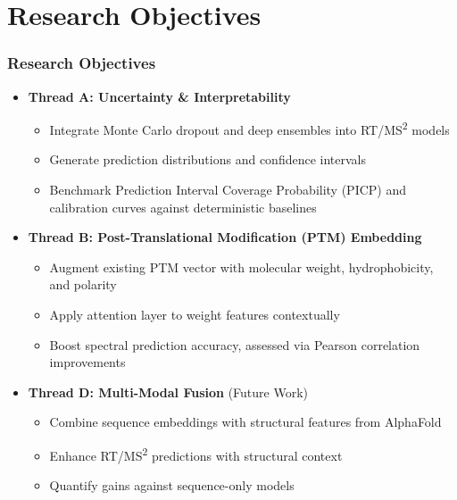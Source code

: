 \documentclass{beamer}
\begin{document}
\section{Research Objectives}
\begin{frame}
  \frametitle{Research Objectives}
  \begin{itemize}
    \item \textbf{Thread A: Uncertainty \& Interpretability}
    \begin{itemize}
      \item Integrate Monte Carlo dropout and deep ensembles into RT/MS\textsuperscript{2} models
      \item Generate prediction distributions and confidence intervals
      \item Benchmark Prediction Interval Coverage Probability (PICP) and calibration curves against deterministic baselines
    \end{itemize}
    \item \textbf{Thread B: Post-Translational Modification (PTM) Embedding}
    \begin{itemize}
      \item Augment existing PTM vector with molecular weight, hydrophobicity, and polarity
      \item Apply attention layer to weight features contextually
      \item Boost spectral prediction accuracy, assessed via Pearson correlation improvements
    \end{itemize}
    \item \textbf{Thread D: Multi-Modal Fusion} (Future Work)
    \begin{itemize}
      \item Combine sequence embeddings with structural features from AlphaFold
      \item Enhance RT/MS\textsuperscript{2} predictions with structural context
      \item Quantify gains against sequence-only models
    \end{itemize}
  \end{itemize}
\end{frame}
\end{document}
